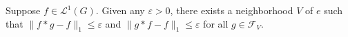 \begin{lemma}
Suppose $f \in \mathcal{L}^1(G)$. Given any $\varepsilon > 0$, there exists a neighborhood $V$ of $e$ such that $\| f * g - f \|_1 \leq \varepsilon$ and $\| g * f - f \|_1 \leq \varepsilon$ for all $g \in \mathcal{F}_V$.
\end{lemma}
